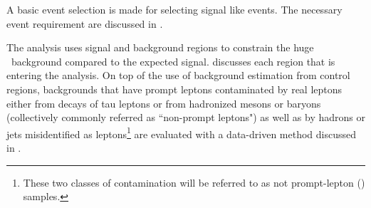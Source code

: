  A basic event selection is made for selecting signal like events. The necessary event requirement are discussed in . 

The analysis uses signal and background regions to constrain the huge \SM\ background compared to the expected signal.  discusses each region that is entering the analysis. On top of the use of background estimation from control regions, backgrounds that have  prompt leptons  contaminated by real leptons either
from decays of tau leptons or from hadronized mesons or baryons
(collectively commonly referred as ``non-prompt leptons") as well as by
hadrons or jets misidentified as leptons\footnote{These two classes
	of contamination will be referred to as not prompt-lepton (\NPL) samples.} are
evaluated with a data-driven method discussed in .


